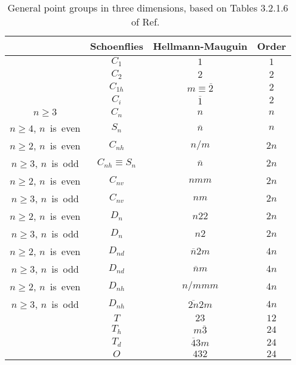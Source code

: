\begin{table}[tb]
  \centering
  \caption{
    General point groups in three dimensions, based on Tables 3.2.1.6 of Ref.~\cite{hahn2016point}
  }
  \label{tab:point_groups}
  \begin{tabular}{cccc}
    \hline \hline
    & Schoenflies & Hellmann-Mauguin & Order \\
    \hline
    & $C_{1}$ & $1$                     & $1$ \\
    & $C_{2}$ & $2$                     & $2$ \\
    & $C_{1h}$ & $m \equiv \overline{2}$ & $2$ \\
    & $C_{i}$ & $\overline{1}$          & $2$ \\
    \hline
    $n \geq 3$                     & $C_{n}$               & $n$            & $n$ \\
    $n \geq 4$, \mbox{$n$ is even} & $S_{n}$               & $\overline{n}$ & $n$ \\
    $n \geq 2$, \mbox{$n$ is even} & $C_{nh}$              & $n / m$        & $2n$ \\
    $n \geq 3$, \mbox{$n$ is odd}  & $C_{nh} \equiv S_{n}$ & $\overline{n}$ & $2n$ \\
    $n \geq 2$, \mbox{$n$ is even} & $C_{nv}$              & $nmm$          & $2n$ \\
    $n \geq 3$, \mbox{$n$ is odd}  & $C_{nv}$              & $nm$           & $2n$ \\
    \hline
    $n \geq 2$, \mbox{$n$ is even} & $D_{n}$  & $n22$             & $2n$ \\
    $n \geq 3$, \mbox{$n$ is odd}  & $D_{n}$  & $n2$              & $2n$ \\
    $n \geq 2$, \mbox{$n$ is even} & $D_{nd}$ & $\overline{n}2m$  & $4n$ \\
    $n \geq 3$, \mbox{$n$ is odd}  & $D_{nd}$ & $\overline{n}m$   & $4n$ \\
    $n \geq 2$, \mbox{$n$ is even} & $D_{nh}$ & $n/mmm$           & $4n$ \\
    $n \geq 3$, \mbox{$n$ is odd}  & $D_{nh}$ & $\overline{2n}2m$ & $4n$ \\
    \hline
    & $T$     & $23$             & $12$ \\
    & $T_{h}$ & $m\overline{3}$  & $24$ \\
    & $T_{d}$ & $\overline{4}3m$ & $24$ \\
    & $O$     & $432$            & $24$ \\

\end{tabular}
\end{table}
